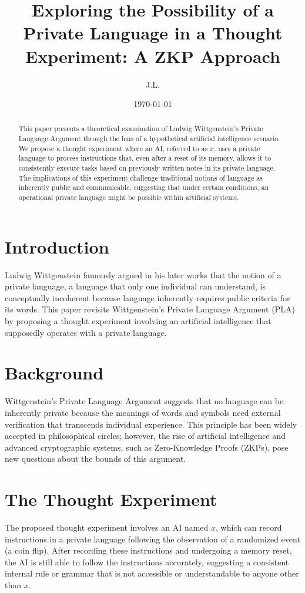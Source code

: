 \documentclass[12pt]{article}
\title{Exploring the Possibility of a Private Language in a Thought Experiment: A ZKP Approach}
\author{J.L.}
\date{\today}
\begin{document}
\maketitle

\begin{abstract}
This paper presents a theoretical examination of Ludwig Wittgenstein's Private Language Argument through the lens of a hypothetical artificial intelligence scenario. We propose a thought experiment where an AI, referred to as \( x \), uses a private language to process instructions that, even after a reset of its memory, allows it to consistently execute tasks based on previously written notes in its private language. The implications of this experiment challenge traditional notions of language as inherently public and communicable, suggesting that under certain conditions, an operational private language might be possible within artificial systems.
\end{abstract}

\section{Introduction}
Ludwig Wittgenstein famously argued in his later works that the notion of a private language, a language that only one individual can understand, is conceptually incoherent because language inherently requires public criteria for its words. This paper revisits Wittgenstein’s Private Language Argument (PLA) by proposing a thought experiment involving an artificial intelligence that supposedly operates with a private language.

\section{Background}
Wittgenstein’s Private Language Argument suggests that no language can be inherently private because the meanings of words and symbols need external verification that transcends individual experience. This principle has been widely accepted in philosophical circles; however, the rise of artificial intelligence and advanced cryptographic systems, such as Zero-Knowledge Proofs (ZKPs), pose new questions about the bounds of this argument.

\section{The Thought Experiment}
The proposed thought experiment involves an AI named \( x \), which can record instructions in a private language following the observation of a randomized event (a coin flip). After recording these instructions and undergoing a memory reset, the AI is still able to follow the instructions accurately, suggesting a consistent internal rule or grammar that is not accessible or understandable to anyone other than \( x \).
\end{document}
